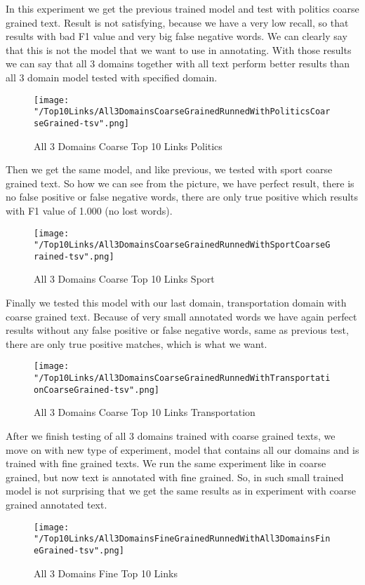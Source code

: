\documentclass[thesis=M,english]{FITthesis}[2018/05/30]
\begin{document}
	
	In this experiment we get the previous trained model and test with politics coarse grained text. Result is not satisfying, because we have a very low recall, so that results with bad F1 value and very big false negative words. We can clearly say that this is not the model that we want to use in annotating. With those results we can say that all 3 domains together with all text perform better results than all 3 domain model tested with specified domain.  
	\begin{figure}[H]\centering
		\texttt{[image: "/Top10Links/All3DomainsCoarseGrainedRunnedWithPoliticsCoarseGrained-tsv".png]}
		\caption{All 3 Domains Coarse Top 10 Links Politics}\label{img:All3DomainWithPoliticsCoarseTop10}
	\end{figure}	

	Then we get the same model, and like previous, we tested with sport coarse grained text. So how we can see from the picture, we have perfect result, there is no false positive or false negative words, there are only true positive which results with F1 value of 1.000 (no lost words).
	\begin{figure}[H]\centering
		\texttt{[image: "/Top10Links/All3DomainsCoarseGrainedRunnedWithSportCoarseGrained-tsv".png]}
		\caption{All 3 Domains Coarse Top 10 Links Sport}\label{img:All3DomainWithSportCoarseTop10}
	\end{figure}
	
	Finally we tested this model with our last domain, transportation domain with coarse grained text.	Because of very small annotated words we have again perfect results without any false positive or false negative words, same as previous test, there are only true positive matches, which is what we want.
	\begin{figure}[H]\centering
		\texttt{[image: "/Top10Links/All3DomainsCoarseGrainedRunnedWithTransportationCoarseGrained-tsv".png]}
		\caption{All 3 Domains Coarse Top 10 Links Transportation}\label{img:All3DomainWithTransportationCoarseTop10}	
	\end{figure}
		
	
	After we finish testing of all 3 domains trained with coarse grained texts, we move on with new type of experiment, model that contains all our domains and is trained with fine grained texts. We run the same experiment like in coarse grained, but now text is annotated with fine grained. So, in such small trained model is not surprising that we get the same results as in experiment with coarse grained annotated text.
	\begin{figure}[H]\centering
		\texttt{[image: "/Top10Links/All3DomainsFineGrainedRunnedWithAll3DomainsFineGrained-tsv".png]}
		\caption{All 3 Domains Fine Top 10 Links }\label{img:All3DomainWithAll3DomainFineTop10}	
	\end{figure}
	
\end{document}
